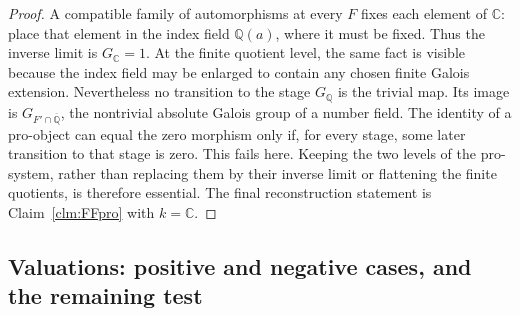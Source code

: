 \documentclass[11pt]{article}
\begin{document}
\begin{proof}
A compatible family of automorphisms at every \(F\) fixes each
element of \(\mathbb C\): place that element in the index field
\(\mathbb Q(a)\), where it must be fixed. Thus the inverse
limit is \(G_{\mathbb C}=1\). At the finite quotient level,
the same fact is visible because the index field may be enlarged
to contain any chosen finite Galois extension.
Nevertheless no transition to the stage \(G_{\mathbb Q}\)
is the trivial map. Its image is
\(G_{F'\cap\overline{\mathbb Q}}\), the nontrivial absolute
Galois group of a number field. The identity of a pro-object
can equal the zero morphism only if, for every stage, some later
transition to that stage is zero. This fails here. Keeping the
two levels of the pro-system, rather than replacing them by
their inverse limit or flattening the finite quotients, is
therefore essential. The final reconstruction statement is
Claim~\ref{clm:FFpro} with \(k=\mathbb C\).
\end{proof}


\subsection{Valuations: positive and negative cases, and the remaining test}
\end{document}
